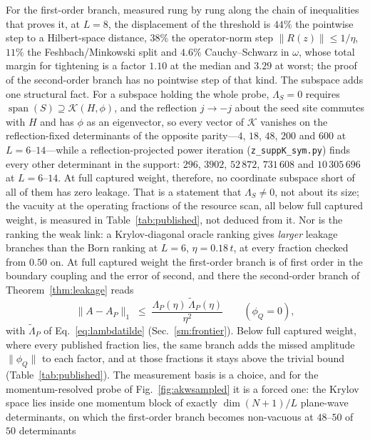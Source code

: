 For the first-order branch, measured rung by rung along the chain of inequalities that proves it, at $L=8$,
the displacement of the threshold is $44\%$ the pointwise step to a Hilbert-space distance, $38\%$ the
operator-norm step $\lVert R(z)\rVert\le1/\eta$, $11\%$ the Feshbach/Minkowski split and $4.6\%$
Cauchy--Schwarz in $\omega$, whose total margin for tightening is a factor $1.10$ at the median and
$3.29$ at worst; the proof of the second-order branch has no pointwise step of that kind. The subspace adds
one structural fact. For a subspace holding the whole probe, $\Lambda_S=0$
requires $\operatorname{span}(S)\supseteq\mathcal K(H,\phi)$, and the reflection $j\to-j$ about the
seed site commutes with $H$ and has $\phi$ as an eigenvector, so every vector of $\mathcal K$ vanishes on
the reflection-fixed determinants of the opposite parity---$4$, $18$, $48$, $200$ and $600$ at
$L=6$--$14$---while a reflection-projected power iteration (\texttt{z\_suppK\_sym.py}) finds every other
determinant in the support: $296$, $3902$, $52\,872$, $731\,608$ and $10\,305\,696$ at $L=6$--$14$. At
full captured weight, therefore, no coordinate subspace short of all of them has zero leakage. That is a
statement that $\Lambda_S\neq0$, not about its size; the vacuity at the operating fractions of the
resource scan, all below full captured weight, is measured in Table~\ref{tab:published}, not deduced
from it. Nor is the ranking the weak link: a Krylov-diagonal oracle ranking gives \emph{larger} leakage branches than the
Born ranking at $L=6$, $\eta=0.18\,t$, at every fraction checked from $0.50$ on. At full captured weight
the first-order branch is of first order in the boundary coupling and the error of second, and there the
second-order branch of Theorem~\ref{thm:leakage} reads
\begin{equation}
\lVert A-A_P\rVert_1\;\le\;\frac{\Lambda_P(\eta)\,\tilde\Lambda_P(\eta)}{\eta^{2}}\qquad(\phi_Q=0),
\label{eq:secondorder}
\end{equation}
with $\tilde\Lambda_P$ of Eq.~\eqref{eq:lambdatilde} (Sec.~\ref{sm:frontier}). Below full captured weight,
where every published fraction lies, the same branch adds the missed amplitude $\lVert\phi_Q\rVert$ to each
factor, and at those fractions it stays above the trivial bound (Table~\ref{tab:published}). The measurement basis
is a choice, and for the momentum-resolved probe of Fig.~\ref{fig:akwsampled} it is a forced one: the
Krylov space lies inside one momentum block of exactly $\dim(N{+}1)/L$
plane-wave determinants, on which the first-order branch becomes non-vacuous at $48$--$50$ of $50$ determinants
